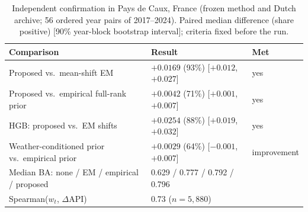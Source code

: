 \begin{table}[!t]
\caption{Independent confirmation in Pays de Caux, France (frozen method and Dutch archive; 56 ordered year pairs of 2017--2024). Paired median difference (share positive) [90\% year-block bootstrap interval]; criteria fixed before the run.}
\label{tab:fr}
\centering\footnotesize\setlength{\tabcolsep}{3pt}
\begin{tabular}{@{}p{2.8cm}p{3.7cm}l@{}}
\toprule
Comparison & Result & Met\\
\midrule
Proposed vs.\ mean-shift EM & $+0.0169$ (93\%) [$+0.012$, $+0.027$] & yes\\
Proposed vs.\ empirical full-rank prior & $+0.0042$ (71\%) [$+0.001$, $+0.007$] & yes\\
HGB: proposed vs.\ EM shifts & $+0.0254$ (88\%) [$+0.019$, $+0.032$] & yes\\
Weather-conditioned prior vs.\ empirical prior & $+0.0029$ (64\%) [$-0.001$, $+0.007$] & improvement\\
\midrule
Median BA: none / EM / empirical / proposed & 0.629 / 0.777 / 0.792 / 0.796 & \\
Spearman($w_t$, $\Delta$API) & 0.73 ($n=5,880$) & \\
\bottomrule
\end{tabular}
\end{table}